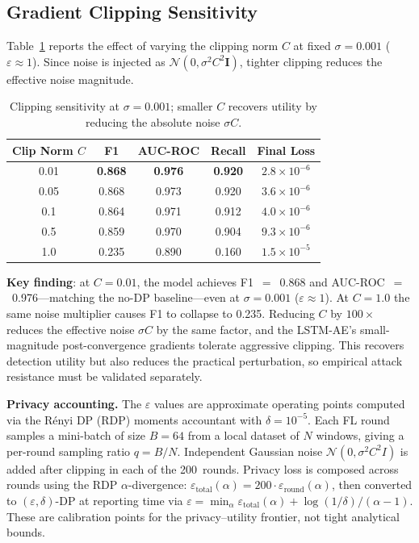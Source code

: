 \subsection{Gradient Clipping Sensitivity}
\label{subsec:eval_clipping}

Table~\ref{tab:clip_norm} reports the effect of varying the clipping norm $C$
at fixed $\sigma{=}0.001$ ($\varepsilon \approx 1$). Since noise is injected as
$\mathcal{N}(0, \sigma^2 C^2 \mathbf{I})$, tighter clipping reduces the
effective noise magnitude.

\begin{table}[H]
    \centering
    \small
    \begin{tabular}{|c|c|c|c|c|}
        \hline
        \textbf{Clip Norm $C$} & \textbf{F1} & \textbf{AUC-ROC}
        & \textbf{Recall} & \textbf{Final Loss} \\
        \hline
        0.01 & \textbf{0.868} & \textbf{0.976} & \textbf{0.920}
        & $2.8 \times 10^{-6}$ \\
        \hline
        0.05 & 0.868 & 0.973 & 0.920 & $3.6 \times 10^{-6}$ \\
        \hline
        0.1 & 0.864 & 0.971 & 0.912 & $4.0 \times 10^{-6}$ \\
        \hline
        0.5 & 0.859 & 0.970 & 0.904 & $9.3 \times 10^{-6}$ \\
        \hline
        1.0 & 0.235 & 0.890 & 0.160 & $1.5 \times 10^{-5}$ \\
        \hline
    \end{tabular}
    \caption{Clipping sensitivity at $\sigma{=}0.001$; smaller $C$ recovers
             utility by reducing the absolute noise $\sigma C$.}
    \label{tab:clip_norm}
\end{table}

\textbf{Key finding}: at $C{=}0.01$, the model achieves F1~$=$~0.868 and
AUC-ROC~$=$~0.976---matching the no-DP baseline---even at $\sigma{=}0.001$
($\varepsilon \approx 1$). At $C{=}1.0$ the same noise multiplier causes F1 to
collapse to 0.235. Reducing $C$ by $100\times$ reduces the effective noise
$\sigma C$ by the same factor, and the LSTM-AE's small-magnitude post-convergence
gradients tolerate aggressive clipping. This recovers detection utility but also
reduces the practical perturbation, so empirical attack resistance must be
validated separately.

\textbf{Privacy accounting.} The $\varepsilon$ values are approximate
operating points computed via the R\'enyi DP (RDP) moments accountant with
$\delta{=}10^{-5}$. Each FL round samples a mini-batch of size $B{=}64$ from a
local dataset of $N$ windows, giving a per-round sampling ratio $q = B/N$.
Independent Gaussian noise $\mathcal{N}(0, \sigma^2 C^2 I)$ is added after
clipping in each of the 200~rounds. Privacy loss is composed across rounds
using the RDP $\alpha$-divergence: $\varepsilon_{\text{total}}(\alpha) =
200 \cdot \varepsilon_{\text{round}}(\alpha)$, then converted to
$(\varepsilon, \delta)$-DP at reporting time via $\varepsilon =
\min_{\alpha} \varepsilon_{\text{total}}(\alpha) + \log(1/\delta)/(\alpha-1)$.
These are calibration points for the privacy--utility frontier, not tight
analytical bounds.

